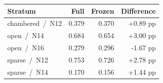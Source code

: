 \begin{tabular}{lrrr}
\toprule
Stratum & Full & Frozen & Difference \\
\midrule
chambered \,/\, N12 & 0.379 & 0.370 & +0.89 pp \\
open \,/\, N14 & 0.684 & 0.654 & +3.00 pp \\
open \,/\, N16 & 0.279 & 0.296 & -1.67 pp \\
sparse \,/\, N12 & 0.753 & 0.726 & +2.78 pp \\
sparse \,/\, N14 & 0.170 & 0.156 & +1.44 pp \\
\bottomrule
\end{tabular}
